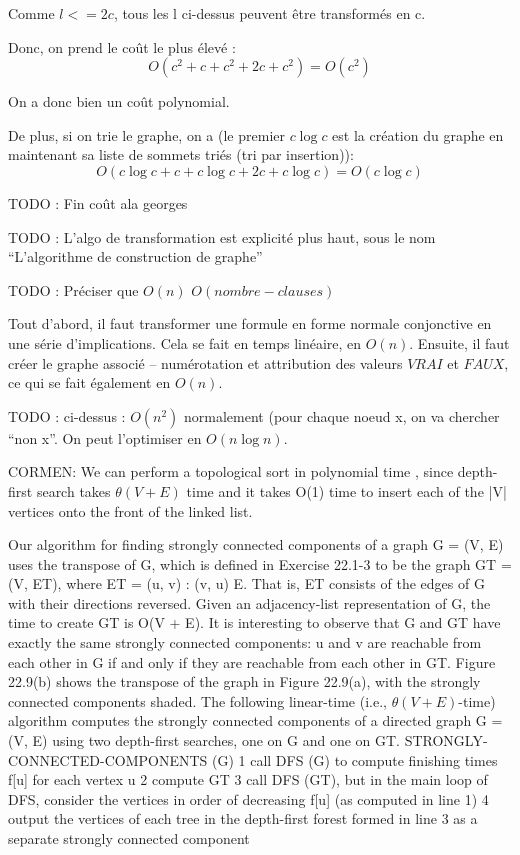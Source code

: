 \documentclass{article}
\begin{document}
Comme $l <= 2c$, tous les l ci-dessus peuvent être transformés en c.

Donc, on prend le coût le plus élevé :
$$
O(c^2 + c + c^2 + 2c + c^2) = O(c^2)
$$

On a donc bien un coût polynomial.

De plus, si on trie le graphe, on a (le premier $c \log c$ est la création du graphe en maintenant sa liste de sommets triés (tri par insertion)):
$$
O(c \log c + c + c \log c + 2c + c \log c) = O(c \log c)
$$


TODO : Fin coût ala georges




TODO : L'algo de transformation est explicité plus haut, sous le nom ``L'algorithme de construction de graphe''


TODO : Préciser que $O(n)$ $O(nombre-clauses)$

Tout d'abord, il faut transformer une formule en forme normale conjonctive en une série d'implications. Cela se fait en temps linéaire, en $O(n)$. Ensuite, il faut créer le graphe associé -- numérotation et attribution des valeurs $VRAI$ et $FAUX$, ce qui se fait également en $O(n)$.

TODO : ci-dessus : $O(n^2)$ normalement (pour chaque noeud x, on va chercher ``non x''. On peut l'optimiser en $O(n \log n)$.

CORMEN:
We can perform a topological sort in polynomial time , since depth-first search takes $\theta(V + E)$
time and it takes O(1) time to insert each of the |V| vertices onto the front of the linked list.


Our algorithm for finding strongly connected components of a graph G = (V, E) uses the
transpose of G, which is defined in Exercise 22.1-3 to be the graph GT = (V, ET), where ET =
{(u, v) : (v, u) E}. That is, ET consists of the edges of G with their directions reversed. Given
an adjacency-list representation of G, the time to create GT is O(V + E). It is interesting to
observe that G and GT have exactly the same strongly connected components: u and v are
reachable from each other in G if and only if they are reachable from each other in GT. Figure
22.9(b) shows the transpose of the graph in Figure 22.9(a), with the strongly connected
components shaded.
The following linear-time (i.e., $\theta(V + E)$-time) algorithm computes the strongly connected
components of a directed graph G = (V, E) using two depth-first searches, one on G and one
on GT.
STRONGLY-CONNECTED-COMPONENTS (G)
1 call DFS (G) to compute finishing times f[u] for each vertex u
2 compute GT
3 call DFS (GT), but in the main loop of DFS, consider the vertices
in order of decreasing f[u] (as computed in line 1)
4 output the vertices of each tree in the depth-first forest formed in
line 3 as a
separate strongly connected component
\end{document}
